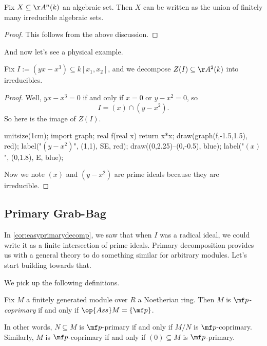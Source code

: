 \begin{corollary}
	Fix $X\subseteq\AA^n(k)$ an algebraic set. Then $X$ can be written as the union of finitely many irreducible algebraic sets.
\end{corollary}
\begin{proof}
	This follows from the above discussion.
\end{proof}
And now let's see a physical example.
\begin{exe}
	Fix $I:=\left(yx-x^3\right)\subseteq k[x_1,x_2]$, and we decompose $Z(I)\subseteq\AA^2(k)$ into irreducibles.
\end{exe}
\begin{proof}
	Well, $yx-x^3=0$ if and only if $x=0$ or $y-x^2=0$, so
	\[I=(x)\cap\left(y-x^2\right).\]
	So here is the image of $Z(I)$.
	\begin{center}
		\begin{asy}
			unitsize(1cm);
			import graph;
			real f(real x)
			{
				return x*x;
			}
			draw(graph(f,-1.5,1.5), red);
			label("$\left(y-x^2\right)$", (1,1), SE, red);
			draw((0,2.25)--(0,-0.5), blue);
			label("$(x)$", (0,1.8), E, blue);
		\end{asy}
	\end{center}
	Now we note $(x)$ and $\left(y-x^2\right)$ are prime ideals because they are irreducible.
\end{proof}

\subsection{Primary Grab-Bag}
In \autoref{cor:easyprimarydecomp}, we saw that when $I$ was a radical ideal, we could write it as a finite intersection of prime ideals. Primary decomposition provides us with a general theory to do something similar for arbitrary modules. Let's start building towards that.

We pick up the following definitions.
\primarydefi*
\begin{definition}[Coprimary]
	Fix $M$ a finitely generated module over $R$ a Noetherian ring. Then $M$ is \textit{$\mf p$-coprimary} if and only if $\op{Ass}M=\{\mf p\}$.
\end{definition}
In other words, $N\subseteq M$ is $\mf p$-primary if and only if $M/N$ is $\mf p$-coprimary. Similarly, $M$ is $\mf p$-coprimary if and only if $(0)\subseteq M$ is $\mf p$-primary.

